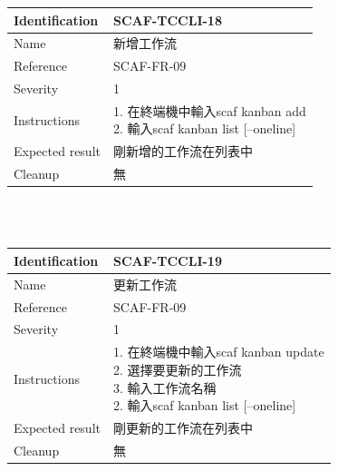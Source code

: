 \documentclass{report}
\begin{document}
\begin{tabularx}{\textwidth}{
  |p{}%
  |p{}|%
  }
  \hline
  \centering Identification &  SCAF-TCCLI-18 \\
  \hline
  \centering Name & 新增工作流 \\
  \hline
  \centering Reference & SCAF-FR-09 \\
  \hline
  \centering Severity & 1 \\
  \hline
  \centering Instructions & 
  \makecell[l]{
    1. 在終端機中輸入scaf kanban add\\
    2. 輸入scaf kanban list [--oneline] \\
  }\\
  \hline
  \centering Expected result & 剛新增的工作流在列表中 \\
  \hline
  \centering Cleanup & 無 \\
  \hline
\end{tabularx}
\\
\newline
\\

\begin{tabularx}{\textwidth}{
  |p{}%
  |p{}|%
  }
  \hline
  \centering Identification &  SCAF-TCCLI-19 \\
  \hline
  \centering Name & 更新工作流 \\
  \hline
  \centering Reference & SCAF-FR-09 \\
  \hline
  \centering Severity & 1 \\
  \hline
  \centering Instructions & 
  \makecell[l]{
    1. 在終端機中輸入scaf kanban update\\
    2. 選擇要更新的工作流 \\
    3. 輸入工作流名稱 \\
    2. 輸入scaf kanban list [--oneline] \\
  }\\
  \hline
  \centering Expected result & 剛更新的工作流在列表中 \\
  \hline
  \centering Cleanup & 無 \\
  \hline
\end{tabularx}
\\
\newline
\\
\end{document}
